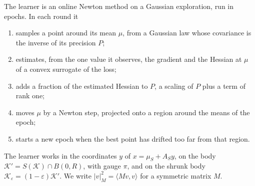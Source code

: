\documentclass[11pt]{amsart}
\theoremstyle{definition}
\numberwithin{equation}{section}
\newcommand{\cK}{\mathcal{K}}
\newcommand{\ip}[1]{\langle #1\rangle}
\begin{document}
The learner is an online Newton method \cite[Section~3.2]{HAK07} on a Gaussian exploration, run in epochs. In each round it
\begin{enumerate}[label=(\arabic*)]
\item samples a point around its mean $\mu$, from a Gaussian law whose covariance is the inverse of its precision $P$;
\item estimates, from the one value it observes, the gradient and the Hessian at $\mu$ of a convex surrogate of the loss;
\item adds a fraction of the estimated Hessian to $P$, a scaling of $P$ plus a term of rank one;
\item moves $\mu$ by a Newton step, projected onto a region around the means of the epoch;
\item starts a new epoch when the best point has drifted too far from that region.
\end{enumerate}
The learner works in the coordinates $y$ of $x=\mu_S+A_Sy$, on the body $\cK'=S(\cK)\cap B(0,R)$, with gauge $\pi$, and on the shrunk body $\cK_\varepsilon=(1-\varepsilon)\cK'$. We write $|v|_M^2=\ip{Mv,v}$ for a symmetric matrix $M$.
\end{document}
